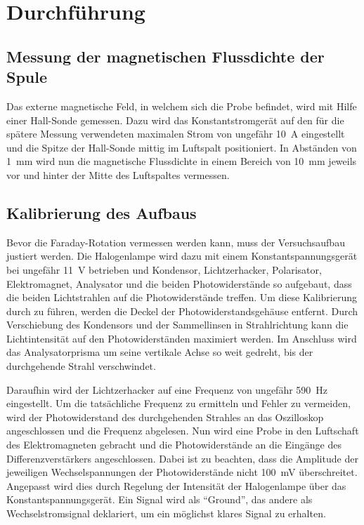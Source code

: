 \section{Durchführung}
\label{sec:Durchführung}

\subsection{Messung der magnetischen Flussdichte der Spule}
\label{sec:MessungBFeld}

Das externe magnetische Feld, in welchem sich die Probe befindet, wird
mit Hilfe einer Hall-Sonde gemessen.
Dazu wird das Konstantstromgerät auf den für die spätere Messung verwendeten
maximalen Strom von ungefähr \SI{10}{\ampere} eingestellt und die
Spitze der Hall-Sonde mittig im Luftspalt positioniert.
In Abständen von \SI{1}{\milli\meter} wird nun die magnetische Flussdichte
in einem Bereich von \SI{10}{\milli\meter} jeweils vor und hinter der
Mitte des Luftspaltes vermessen.

\subsection{Kalibrierung des Aufbaus}
\label{sec:Kalibrierung}

Bevor die Faraday-Rotation vermessen werden kann, muss der Versuchsaufbau
justiert werden. Die Halogenlampe wird dazu mit einem
Konstantspannungsgerät bei ungefähr \SI{11}{\volt} betrieben und
Kondensor, Lichtzerhacker, Polarisator, Elektromagnet, Analysator und
die beiden Photowiderstände so aufgebaut, dass die beiden Lichtstrahlen auf
die Photowiderstände treffen.
Um diese Kalibrierung durch zu führen, werden die Deckel der
Photowiderstandsgehäuse entfernt.
Durch Verschiebung des Kondensors und der Sammellinsen in Strahlrichtung
kann die Lichtintensität auf den Photowiderständen maximiert werden.
Im Anschluss wird das Analysatorprisma um seine vertikale Achse so weit
gedreht, bis der durchgehende Strahl verschwindet.

Daraufhin wird der Lichtzerhacker auf eine Frequenz von ungefähr
\SI{590}{\hertz} eingestellt. Um die tatsächliche Frequenz zu ermitteln und
Fehler zu vermeiden, wird der Photowiderstand des durchgehenden
Strahles an das Oszilloskop angeschlossen und die Frequenz abgelesen.
Nun wird eine Probe in den Luftschaft des Elektromagneten gebracht und
die Photowiderstände an die Eingänge des Differenzverstärkers angeschlossen.
Dabei ist zu beachten, dass die Amplitude der jeweiligen
Wechselspannungen der Photowiderstände nicht \SI{100}{\milli\volt}
überschreitet. Angepasst wird dies durch Regelung der Intensität der
Halogenlampe über das Konstantspannungsgerät.
Ein Signal wird als \enquote{Ground}, das andere als Wechselstromsignal deklariert,
um ein möglichst klares Signal zu erhalten.

